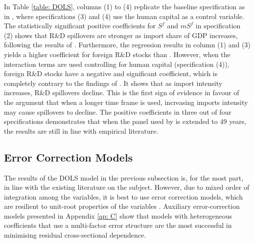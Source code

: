 \documentclass[12pt]{article}
\begin{document}
In Table \ref{table: DOLS}, columns (1) to (4) replicate the baseline specification as in \citet{Coe1995}, where specifications (3) and (4) use the human capital as a control variable. The statistically significant positive coefficients for $S^{f}$ and $mS^{f}$ in specification (2) shows that R\&D spillovers are stronger as import share of GDP increases, following the results of \citet{Lichtenberg1998}. Furthermore, the regression results in column (1) and (3) yields a higher coefficient for foreign R\&D stocks than \citet{Coe2009}. However, when the interaction terms are used controlling for human capital (specification (4)), foreign R\&D stocks have a negative and significant coefficient, which is completely contrary to the findings of \citet{Coe2009}. It shows that as import intensity increases, R\&D spillovers decline. This is the first sign of evidence in favour of the argument that when a longer time frame is used, increasing imports intensity may cause spillovers to decline. The positive coefficients in three out of four specifications demonstrates that when the panel used by \citet{Coe2009} is extended to 49 years, the results are still in line with empirical literature.

\subsection{Error Correction Models}
The results of the DOLS model in the previous subsection is, for the most part, in line with the existing literature on the subject. However, due to mixed order of integration among the variables, it is best to use error correction models, which are resilient to unit-root properties of the variables \citep{Engle1987}. Auxiliary error-correction models presented in Appendix \ref{ap: C} show that models with heterogeneous coefficients that use a multi-factor error structure are the most successful in minimising residual cross-sectional dependence.
\end{document}
